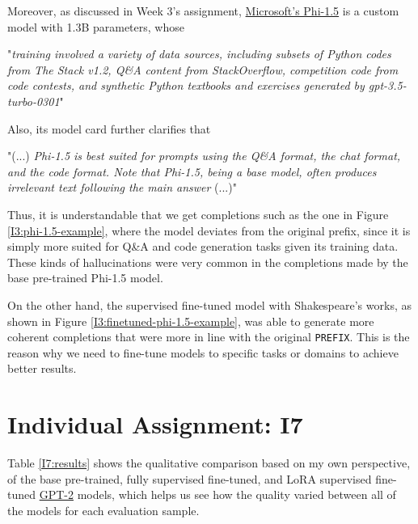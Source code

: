 \documentclass{article}
\begin{document}
Moreover, as discussed in Week 3's assignment, \href{https://huggingface.co/microsoft/phi-1\_5}{Microsoft's Phi-1.5} is a custom model with 1.3B parameters, whose

\begin{displayquote}
    "\textit{training involved a variety of data sources, including subsets of Python codes from The Stack v1.2, Q\&A content from StackOverflow, competition code from code contests, and synthetic Python textbooks and exercises generated by gpt-3.5-turbo-0301}" \cite{huggingfacephi1}
\end{displayquote}

Also, its model card further clarifies that

\begin{displayquote}
    "(...) \textit{Phi-1.5 is best suited for prompts using the Q\&A format, the chat format, and the code format. Note that Phi-1.5, being a base model, often produces irrelevant text following the main answer} (...)" \cite{huggingfacephi15}
\end{displayquote}

Thus, it is understandable that we get completions such as the one in Figure \ref{I3:phi-1.5-example}, where the model deviates from the original prefix, since it is simply more suited for Q\&A and code generation tasks given its training data. These kinds of hallucinations were very common in the completions made by the base pre-trained Phi-1.5 model.

On the other hand, the supervised fine-tuned model with Shakespeare's works, as shown in Figure \ref{I3:finetuned-phi-1.5-example}, was able to generate more coherent completions that were more in line with the original \texttt{PREFIX}. This is the reason why we need to fine-tune models to specific tasks or domains to achieve better results.

\section{Individual Assignment: I7}\label{sec:i7}
Table \ref{I7:results} shows the qualitative comparison based on my own perspective, of the base pre-trained, fully supervised fine-tuned, and LoRA supervised fine-tuned \href{https://huggingface.co/openai-community/gpt2-large}{GPT-2} models, which helps us see how the quality varied between all of the models for each evaluation sample. 
\end{document}
